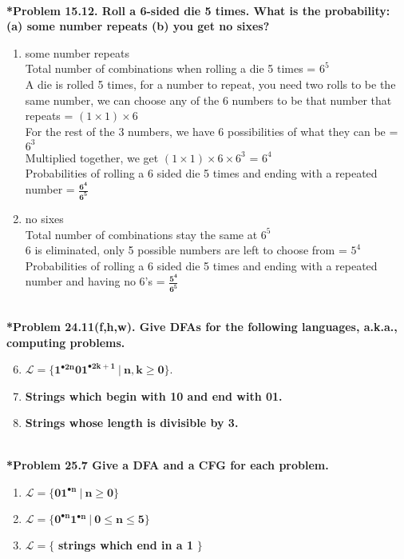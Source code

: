\documentclass{article}
\begin{document}
    \noindent\\[0.25in]
    \noindent\textbf{*Problem 15.12. Roll a 6-sided die 5 times. What is the probability: (a) some number repeats (b) you get no sixes?}
    \begin{enumerate}[label=(\alph*)]
        \item some number repeats
        \\ Total number of combinations when rolling a die 5 times = $6^5$
        \\ A die is rolled 5 times, for a number to repeat, you need two rolls to be the same number, we can choose any of the 6 numbers to be that number that repeats = $(1\times1)\times6$
        \\ For the rest of the 3 numbers, we have 6 possibilities of what they can be = $6^3$
        \\ Multiplied together, we get $(1\times1)\times6\times6^3$ = $6^4$
        \\ Probabilities of rolling a 6 sided die 5 times and ending with a repeated number = {\LARGE $\boxed{\mathbf{\frac{6^4}{6^5}}}$}
        \item no sixes
        \\ Total number of combinations stay the same at $6^5$
        \\ 6 is eliminated, only 5 possible numbers are left to choose from = $5^4$
        \\ Probabilities of rolling a 6 sided die 5 times and ending with a repeated number and having no 6's = {\LARGE $\boxed{\mathbf{\frac{5^4}{6^5}}}$}
    \end{enumerate}

    \noindent\\[0.25in]
    \noindent\textbf{*Problem 24.11(f,h,w). Give DFAs for the following languages, a.k.a., computing problems.}
    \begin{enumerate}[label=(\alph*)]
        \setcounter{enumi}{5}
        \item $\mathbf{\mathcal{L}=\{1^{\bullet 2n}01^{\bullet 2k+1}\ |\ n,k\ge 0\}}$.
        \setcounter{enumi}{7}
        \item \textbf{Strings which begin with 10 and end with 01.}
        \setcounter{enumi}{22}
        \item \textbf{Strings whose length is divisible by 3.}
    \end{enumerate}

    \noindent\\[0.25in]
    \noindent\textbf{*Problem 25.7 Give a DFA and a CFG for each problem.}
    \begin{enumerate}[label=(\alph*)]
        \item $\mathbf{\mathcal{L}=\{01^{\bullet n}\ |\ n\ge 0\}}$
        \item $\mathbf{\mathcal{L}=\{0^{\bullet n}1^{\bullet n}\ |\ 0\le n\le 5\}}$
        \item $\mathbf{\mathcal{L}=\{}$ \textbf{strings which end in a 1} $\mathbf{\}}$
    \end{enumerate}
\end{document}
